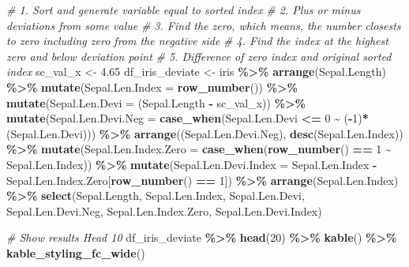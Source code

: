 \documentclass[
]{book}
\newenvironment{Shaded}{\begin{snugshade}}{\end{snugshade}}
\newcommand{\CommentTok}[1]{\textcolor[rgb]{0.56,0.35,0.01}{\textit{#1}}}
\newcommand{\DataTypeTok}[1]{\textcolor[rgb]{0.13,0.29,0.53}{#1}}
\newcommand{\DecValTok}[1]{\textcolor[rgb]{0.00,0.00,0.81}{#1}}
\newcommand{\FloatTok}[1]{\textcolor[rgb]{0.00,0.00,0.81}{#1}}
\newcommand{\KeywordTok}[1]{\textcolor[rgb]{0.13,0.29,0.53}{\textbf{#1}}}
\newcommand{\NormalTok}[1]{#1}
\newcommand{\OperatorTok}[1]{\textcolor[rgb]{0.81,0.36,0.00}{\textbf{#1}}}
\newcommand{\StringTok}[1]{\textcolor[rgb]{0.31,0.60,0.02}{#1}}
\begin{document}
\begin{Shaded}
\begin{Highlighting}[]
\CommentTok{\# 1. Sort and generate variable equal to sorted index}
\CommentTok{\# 2. Plus or minus deviations from some value}
\CommentTok{\# 3. Find the zero, which means, the number closests to zero including zero from the negative side}
\CommentTok{\# 4. Find the index at the highest zero and below deviation point}
\CommentTok{\# 5. Difference of zero index and original sorted index}
\NormalTok{sc\_val\_x \textless{}{-}}\StringTok{ }\FloatTok{4.65}
\NormalTok{df\_iris\_deviate \textless{}{-}}\StringTok{ }\NormalTok{iris }\OperatorTok{\%\textgreater{}\%}\StringTok{ }\KeywordTok{arrange}\NormalTok{(Sepal.Length) }\OperatorTok{\%\textgreater{}\%}
\StringTok{              }\KeywordTok{mutate}\NormalTok{(}\DataTypeTok{Sepal.Len.Index =} \KeywordTok{row\_number}\NormalTok{()) }\OperatorTok{\%\textgreater{}\%}
\StringTok{              }\KeywordTok{mutate}\NormalTok{(}\DataTypeTok{Sepal.Len.Devi =}\NormalTok{ (Sepal.Length }\OperatorTok{{-}}\StringTok{ }\NormalTok{sc\_val\_x)) }\OperatorTok{\%\textgreater{}\%}
\StringTok{              }\KeywordTok{mutate}\NormalTok{(}\DataTypeTok{Sepal.Len.Devi.Neg =}
                       \KeywordTok{case\_when}\NormalTok{(Sepal.Len.Devi }\OperatorTok{\textless{}=}\StringTok{ }\DecValTok{0} \OperatorTok{\textasciitilde{}}\StringTok{ }\NormalTok{(}\OperatorTok{{-}}\DecValTok{1}\NormalTok{)}\OperatorTok{*}\NormalTok{(Sepal.Len.Devi))) }\OperatorTok{\%\textgreater{}\%}
\StringTok{              }\KeywordTok{arrange}\NormalTok{((Sepal.Len.Devi.Neg), }\KeywordTok{desc}\NormalTok{(Sepal.Len.Index)) }\OperatorTok{\%\textgreater{}\%}
\StringTok{              }\KeywordTok{mutate}\NormalTok{(}\DataTypeTok{Sepal.Len.Index.Zero =}
                       \KeywordTok{case\_when}\NormalTok{(}\KeywordTok{row\_number}\NormalTok{() }\OperatorTok{==}\StringTok{ }\DecValTok{1} \OperatorTok{\textasciitilde{}}\StringTok{ }\NormalTok{Sepal.Len.Index)) }\OperatorTok{\%\textgreater{}\%}
\StringTok{              }\KeywordTok{mutate}\NormalTok{(}\DataTypeTok{Sepal.Len.Devi.Index =}
\NormalTok{                       Sepal.Len.Index }\OperatorTok{{-}}\StringTok{ }\NormalTok{Sepal.Len.Index.Zero[}\KeywordTok{row\_number}\NormalTok{() }\OperatorTok{==}\StringTok{ }\DecValTok{1}\NormalTok{]) }\OperatorTok{\%\textgreater{}\%}
\StringTok{              }\KeywordTok{arrange}\NormalTok{(Sepal.Len.Index) }\OperatorTok{\%\textgreater{}\%}
\StringTok{              }\KeywordTok{select}\NormalTok{(Sepal.Length, Sepal.Len.Index, Sepal.Len.Devi,}
\NormalTok{                     Sepal.Len.Devi.Neg, Sepal.Len.Index.Zero, Sepal.Len.Devi.Index)}


\CommentTok{\# Show results Head 10}
\NormalTok{df\_iris\_deviate }\OperatorTok{\%\textgreater{}\%}\StringTok{ }\KeywordTok{head}\NormalTok{(}\DecValTok{20}\NormalTok{) }\OperatorTok{\%\textgreater{}\%}
\StringTok{  }\KeywordTok{kable}\NormalTok{() }\OperatorTok{\%\textgreater{}\%}
\StringTok{  }\KeywordTok{kable\_styling\_fc\_wide}\NormalTok{()}
\end{Highlighting}
\end{Shaded}
\end{document}
